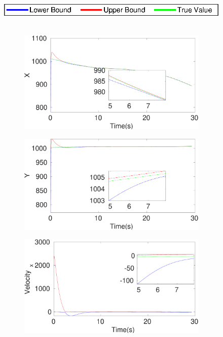 \begin{figure}[h]
\hspace*{\fill} \includegraphics[scale=0.8]{figures/legend}\\\\
\begin{subfigure}{.5\linewidth}
\centering
\includegraphics[width=\linewidth]{figures/Prad/s3capradX}
\end{subfigure}
\begin{subfigure}{.5\linewidth}
\centering
\includegraphics[width=\linewidth]{figures/Prad/s3capradY}
\end{subfigure}
\begin{subfigure}{.5\linewidth}
\centering
\includegraphics[width=\linewidth]{figures/Prad/s3capradVelocity_x}

\end{subfigure}
\end{figure}
